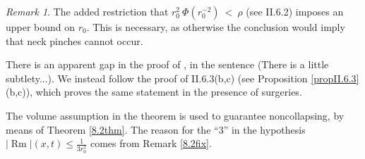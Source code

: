 \documentclass[12pt]{amsart}
\newcommand{\Rm}{\operatorname{Rm}}
\numberwithin{equation}{section}
\theoremstyle{plain}
\theoremstyle{definition}
\theoremstyle{remark}
\newtheorem{remark}[equation]{Remark}
\begin{document}
\begin{remark} \label{rmkI.12.2}
The added restriction that $r_0^2 \: \Phi(r_0^{-2}) \: < \: \rho$ (see II.6.2)
imposes an upper bound on $r_0$.  This is necessary, as
otherwise the conclusion would imply that neck pinches cannot occur.

There is an apparent gap in the proof of \cite[Theorem 12.2]{Perelman}, 
in the sentence
(There is a little subtlety...).  We instead follow the proof
of II.6.3(b,c) (see Proposition \ref{propII.6.3}(b,c)), 
which proves the same statement in the
presence of surgeries.


The volume assumption in the theorem is used to guarantee
noncollapsing, by means of Theorem \ref{8.2thm}. The reason
for the ``$3$'' in the hypothesis $|\Rm|(x, t) \le \frac{1}{3r_0^{2}}$
comes from Remark \ref{8.2fix}.
\end{remark}
\end{document}
